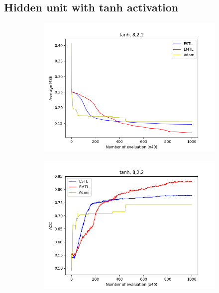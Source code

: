 \documentclass[conference]{IEEEtran}
\theoremstyle{definition}
\begin{document}
  \subsection{Hidden unit with tanh activation}
    \begin{figure}
      \centering
      \begin{subfigure}{0.48\linewidth}
        \centering
        \includegraphics[width=1.0\linewidth]{images/tanh/avg_mse8,2,2.png}
      \end{subfigure}
      \begin{subfigure}{0.48\linewidth}
        \centering
        \includegraphics[width=1.0\linewidth]{images/tanh/avg_acc8,2,2.png}
      \end{subfigure}


\end{figure}
\end{document}
